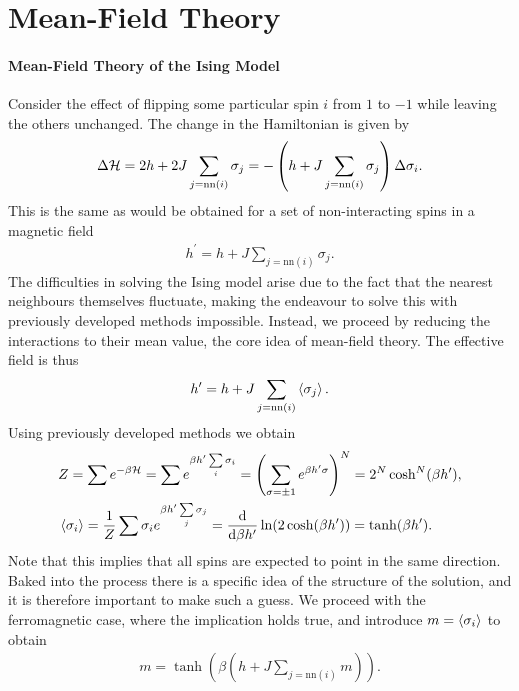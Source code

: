 \section{Mean-Field Theory}

\paragraph{Mean-Field Theory of the Ising Model}
Consider the effect of flipping some particular spin $i$ from $1$ to $-1$ while leaving the others unchanged. The change in the Hamiltonian is given by
\begin{align*}
\Delta\mathcal{H} = 2h + 2J\sum\limits_{j = \text{nn}(i)}\sigma_{j} = -\left(h + J\sum\limits_{j = \text{nn}(i)}\sigma_{j}\right)\Delta\sigma_{i}.
\end{align*}
This is the same as would be obtained for a set of non-interacting spins in a magnetic field
\begin{align*}
h^{\prime} = h + J\sum\limits_{j = \text{nn}(i)}\sigma_{j}.
\end{align*}
The difficulties in solving the Ising model arise due to the fact that the nearest neighbours themselves fluctuate, making the endeavour to solve this with previously developed methods impossible. Instead, we proceed by reducing the interactions to their mean value, the core idea of mean-field theory. The effective field is thus
\begin{align*}
h^{\prime} = h + J\sum\limits_{j = \text{nn}(i)}\expval{\sigma_{j}}.
\end{align*}
Using previously developed methods we obtain
\begin{align*}
&Z = \sum e^{-\beta\mathcal{H}} = \sum e^{\beta h^{\prime}\sum\limits_{i}\sigma_{i}} = \left(\sum\limits_{\sigma = \pm 1}e^{\beta h^{\prime}\sigma}\right)^{N} = 2^{N}\cosh[N](\beta h^{\prime}), \\
&\expval{\sigma_{i}} = \frac{1}{Z}\sum\sigma_{i}e^{\beta h^{\prime}\sum\limits_{j}\sigma_{j}} = \dv{\beta h^{\prime}}\ln(2\cosh(\beta h^{\prime})) = \tanh(\beta h^{\prime}).
\end{align*}
Note that this implies that all spins are expected to point in the same direction. Baked into the process there is a specific idea of the structure of the solution, and it is therefore important to make such a guess. We proceed with the ferromagnetic case, where the implication holds true, and introduce $m = \expval{\sigma_{i}}$ to obtain
\begin{align*}
m = \tanh(\beta\left(h + J\sum\limits_{j = \text{nn}(i)}m\right)).
\end{align*}
